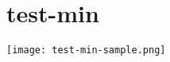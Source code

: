 \documentclass[12pt]{article}
\begin{document}
\tableofcontents
\section{test-min}
\texttt{[image: test-min-sample.png]}
\end{document}

